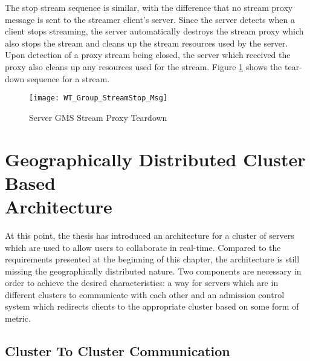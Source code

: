 The stop stream sequence is similar, with the difference that no stream proxy message is sent to the streamer client's server. Since the server detects when a client stops streaming, the server automatically destroys the stream proxy which also stops the stream and cleans up the stream resources used by the server. Upon detection of a proxy stream being closed, the server which received the proxy also cleans up any resources used for the stream. Figure \ref{fig:groupstreamstopseq} shows the tear-down sequence for a stream.

\begin{figure}
	\centering
	\texttt{[image: WT\_Group\_StreamStop\_Msg]}
	\caption{Server GMS Stream Proxy Teardown}
	\label{fig:groupstreamstopseq}
\end{figure}

\section{Geographically Distributed Cluster Based \\ Architecture}

At this point, the thesis has introduced an architecture for a cluster of servers which are used to allow users to collaborate in real-time. Compared to the requirements presented at the beginning of this chapter, the architecture is still missing the geographically distributed nature. Two components are necessary in order to achieve the desired characteristics: a way for servers which are in different clusters to communicate with each other and an admission control system which redirects clients to the appropriate cluster based on some form of metric.

\subsection{Cluster To Cluster Communication}


